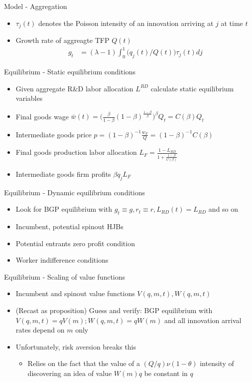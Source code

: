 \documentclass[english,usenames,dvipsnames]{beamer}
\begin{document}
\begin{frame}{Model - Aggregation}
\begin{itemize}
	\item $\tau_j(t)$ denotes the Poisson intensity of an innovation arriving at $j$ at time $t$
	\item Growth rate of aggreagte TFP $Q(t)$
	\begin{align*}
	g_t &= (\lambda -1) \int_0^1 \Big(q_{j}(t)/Q(t)\Big) \tau_j(t) dj 
	\end{align*}
\end{itemize}
\end{frame}

\begin{frame}{Equilibrium - Static equilibrium conditions}
\begin{itemize}
	\item Given aggregate R\&D labor allocation $L^{RD}$ calculate static equilibrium variables
	\item Final goods wage $\bar{w}(t) = \Big(\frac{\beta}{1-\beta} (1-\beta)^{\frac{1-\beta}{\beta}} \Big)^{\beta} Q_t = C(\beta) Q_t$
	\item Intermediate goods price $p = (1-\beta)^{-1} \frac{w_F}{Q} = (1-\beta)^{-1} C(\beta)$
	\item Final goods production labor allocation $L_F = \frac{1 - L_{RD}}{1 + \frac{1-\beta}{C(\beta)}}$
	\item Intermediate goods firm profits $\beta q_j L_F$
\end{itemize}
\end{frame}

\begin{frame}{Equilibrium - Dynamic equilibrium conditions}
\begin{itemize}
	\item Look for BGP equilibrium with $g_t \equiv g, r_t \equiv r, L_{RD}(t) = L_{RD}$ and so on  
	\item Incumbent, potential spinout HJBs
	\item Potential entrants zero profit condition
	\item Worker indifference conditions
\end{itemize}
\end{frame}

\begin{frame}{Equilibrium - Scaling of value functions}
\begin{itemize}
	\item Incumbent and spinout value functions $V(q,m,t),W(q,m,t)$
	\item (Recast as proposition) Guess and verify: BGP equilibrium with $V(q,m,t) = qV(m); W(q,m,t) = qW(m)$ and all innovation arrival rates depend on $m$ only
	\item Unfortunately, \alert{risk aversion breaks this}
	\begin{itemize}
		\item Relies on the fact that the value of a $(Q/q) \nu (1-\theta)$ intensity of discovering an idea of value $W(m)q$ be \alert{constant in $q$}
	\end{itemize}
\end{itemize}
\end{frame}
\end{document}

